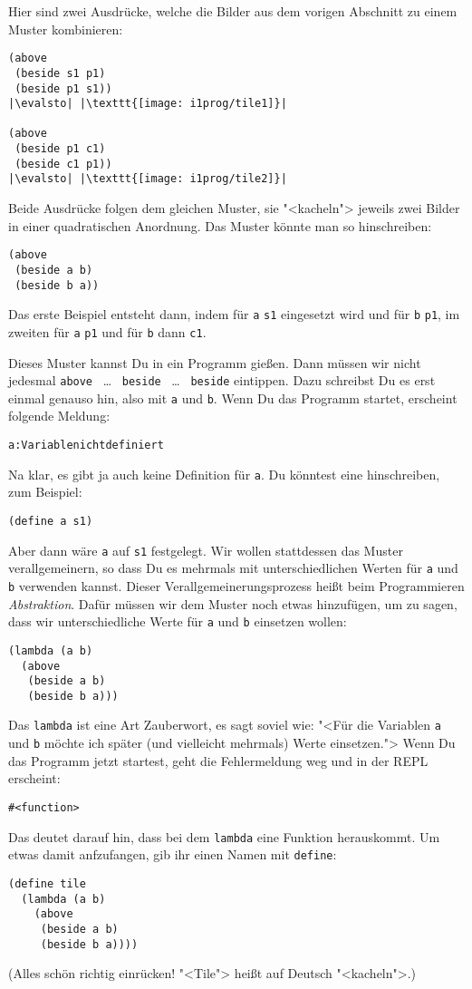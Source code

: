 Hier sind zwei Ausdrücke, welche die Bilder aus dem vorigen Abschnitt
zu einem Muster kombinieren:
%
\begin{lstlisting}
(above
 (beside s1 p1)
 (beside p1 s1))
|\evalsto| |\texttt{[image: i1prog/tile1]}|

(above
 (beside p1 c1)
 (beside c1 p1))
|\evalsto| |\texttt{[image: i1prog/tile2]}|
\end{lstlisting}
%
Beide Ausdrücke folgen dem gleichen Muster, sie "<kacheln"> jeweils zwei
Bilder in einer quadratischen Anordnung.  Das Muster könnte man so
hinschreiben:
%
\begin{lstlisting}
(above
 (beside a b)
 (beside b a))
\end{lstlisting}
%
Das erste Beispiel entsteht dann, indem für \lstinline{a} \lstinline{s1}
eingesetzt wird und für \lstinline{b} \lstinline{p1}, im zweiten für \lstinline{a}
\lstinline{p1} und für \lstinline{b} dann \lstinline{c1}.

Dieses Muster kannst Du in ein Programm gießen.  Dann müssen wir nicht
jedesmal \lstinline{above} ~\ldots~ \lstinline{beside} ~\ldots~ \lstinline{beside} eintippen.
Dazu schreibst Du es erst einmal genauso hin, also mit \lstinline{a} und
\lstinline{b}.  Wenn Du das Programm startet, erscheint folgende Meldung:
%
\begin{alltt}
\color{red}a: Variable nicht definiert
\end{alltt}
%
Na klar, es gibt ja auch keine Definition für \lstinline{a}.  Du könntest
eine hinschreiben, zum Beispiel:
%
\begin{lstlisting}
(define a s1)
\end{lstlisting}
%
Aber dann wäre \lstinline{a} auf \lstinline{s1} festgelegt.  Wir wollen
stattdessen das Muster verallgemeinern, so dass Du es mehrmals mit
unterschiedlichen Werten für \lstinline{a} und \lstinline{b} verwenden
kannst.  Dieser Verallgemeinerungsprozess heißt beim Programmieren
\textit{Abstraktion}.  Dafür müssen wir dem Muster
noch etwas hinzufügen, um zu sagen, dass wir unterschiedliche Werte
für \lstinline{a} und \lstinline{b} einsetzen wollen:
%
\begin{lstlisting}
(lambda (a b)
  (above
   (beside a b)
   (beside b a)))
\end{lstlisting}
%
Das \lstinline{lambda} ist eine Art Zauberwort, es sagt soviel wie: "<Für
die Variablen \lstinline{a} und \lstinline{b} möchte ich später (und
vielleicht mehrmals) Werte einsetzen.">  Wenn Du das Programm jetzt
startest, geht die Fehlermeldung weg und in der REPL erscheint:
%
\begin{lstlisting}
#<function>
\end{lstlisting}
%
Das deutet darauf hin, dass bei dem \lstinline{lambda} eine Funktion
herauskommt.  Um etwas damit anfzufangen, gib ihr einen Namen mit
\lstinline{define}:
%
\begin{lstlisting}
(define tile
  (lambda (a b)
    (above
     (beside a b)
     (beside b a))))
\end{lstlisting}
%
(Alles schön richtig einrücken! "<Tile"> heißt auf Deutsch
"<kacheln">.)

